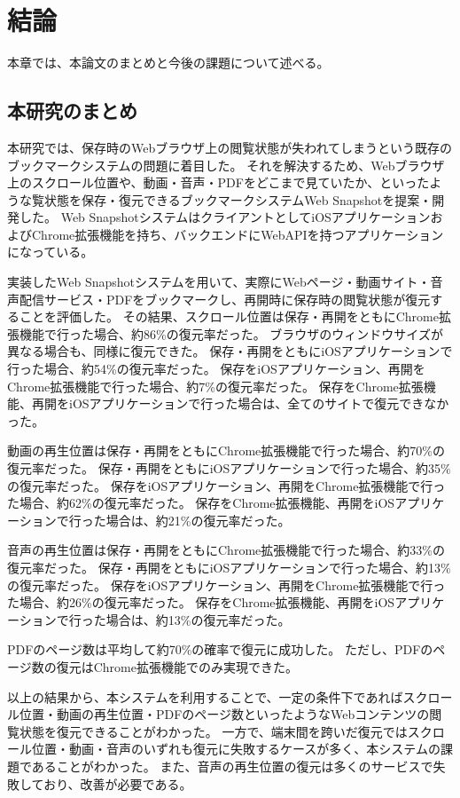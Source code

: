 \chapter{結論}
\label{chap:conclusion}
本章では、本論文のまとめと今後の課題について述べる。

\section{本研究のまとめ}
\label{section:conclusion}
本研究では、保存時のWebブラウザ上の閲覧状態が失われてしまうという既存のブックマークシステムの問題に着目した。
それを解決するため、Webブラウザ上のスクロール位置や、動画・音声・PDFをどこまで見ていたか、といったような覧状態を保存・復元できるブックマークシステムWeb Snapshotを提案・開発した。
Web SnapshotシステムはクライアントとしてiOSアプリケーションおよびChrome拡張機能を持ち、バックエンドにWebAPIを持つアプリケーションになっている。

実装したWeb Snapshotシステムを用いて、実際にWebページ・動画サイト・音声配信サービス・PDFをブックマークし、再開時に保存時の閲覧状態が復元することを評価した。
その結果、スクロール位置は保存・再開をともにChrome拡張機能で行った場合、約86\%の復元率だった。
ブラウザのウィンドウサイズが異なる場合も、同様に復元できた。
保存・再開をともにiOSアプリケーションで行った場合、約54\%の復元率だった。
保存をiOSアプリケーション、再開をChrome拡張機能で行った場合、約7\%の復元率だった。
保存をChrome拡張機能、再開をiOSアプリケーションで行った場合は、全てのサイトで復元できなかった。

動画の再生位置は保存・再開をともにChrome拡張機能で行った場合、約70\%の復元率だった。
保存・再開をともにiOSアプリケーションで行った場合、約35\%の復元率だった。
保存をiOSアプリケーション、再開をChrome拡張機能で行った場合、約62\%の復元率だった。
保存をChrome拡張機能、再開をiOSアプリケーションで行った場合は、約21\%の復元率だった。

音声の再生位置は保存・再開をともにChrome拡張機能で行った場合、約33\%の復元率だった。
保存・再開をともにiOSアプリケーションで行った場合、約13\%の復元率だった。
保存をiOSアプリケーション、再開をChrome拡張機能で行った場合、約26\%の復元率だった。
保存をChrome拡張機能、再開をiOSアプリケーションで行った場合は、約13\%の復元率だった。

PDFのページ数は平均して約70\%の確率で復元に成功した。
ただし、PDFのページ数の復元はChrome拡張機能でのみ実現できた。

以上の結果から、本システムを利用することで、一定の条件下であればスクロール位置・動画の再生位置・PDFのページ数といったようなWebコンテンツの閲覧状態を復元できることがわかった。
一方で、端末間を跨いだ復元ではスクロール位置・動画・音声のいずれも復元に失敗するケースが多く、本システムの課題であることがわかった。
また、音声の再生位置の復元は多くのサービスで失敗しており、改善が必要である。


